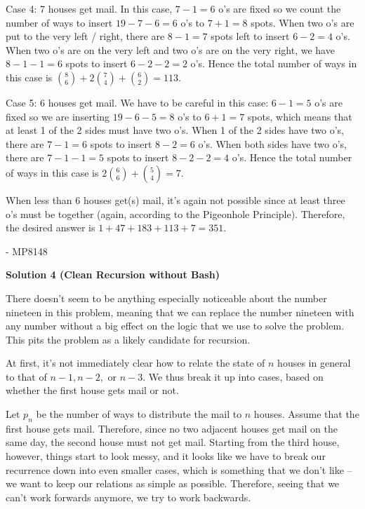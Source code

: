 \begin{enumerate}
 Case 4: 7 houses get mail. In this case, $7-1=6$ o's are fixed so we count the number of ways to insert $19-7-6=6$ o's to $7+1=8$ spots. When two o's are put to the very left / right, there are $8-1=7$ spots left to insert $6-2=4$ o's. When two o's are on the very left and two o's are on the very right, we have $8-1-1=6$ spots to insert $6-2-2=2$ o's. Hence the total number of ways in this case is $\binom{8}{6} + 2\binom{7}{4} + \binom{6}{2} = 113$.

 Case 5: 6 houses get mail. We have to be careful in this case: $6-1=5$ o's are fixed so we are inserting $19-6-5=8$ o's to $6+1=7$ spots, which means that at least 1 of the 2 sides must have two o's. When 1 of the 2 sides have two o's, there are $7-1=6$ spots to insert $8-2=6$ o's. When both sides have two o's, there are $7-1-1=5$ spots to insert $8-2-2=4$ o's. Hence the total number of ways in this case is $2\binom{6}{6} + \binom{5}{4} = 7$. 

 When less than 6 houses get(s) mail, it's again not possible since at least three o's must be together (again, according to the Pigeonhole Principle). Therefore, the desired answer is $1+47+183+113+7=\boxed{351}$.

 - MP8148

 



\textbf{Solution 4 (Clean Recursion without Bash)}

There doesn't seem to be anything especially noticeable about the number nineteen in this problem, meaning that we can replace the number nineteen with any number without a big effect on the logic that we use to solve the problem. This pits the problem as a likely candidate for recursion.

 At first, it's not immediately clear how to relate the state of $n$ houses in general to that of $n - 1, n - 2,$ or $n - 3.$ We thus break it up into cases, based on whether the first house gets mail or not.

 Let $p_n$ be the number of ways to distribute the mail to $n$ houses. Assume that the first house gets mail. Therefore, since no two adjacent houses get mail on the same day, the second house must not get mail. Starting from the third house, however, things start to look messy, and it looks like we have to break our recurrence down into even smaller cases, which is something that we don't like -- we want to keep our relations as simple as possible. Therefore, seeing that we can't work forwards anymore, we try to work backwards.


\end{enumerate}
